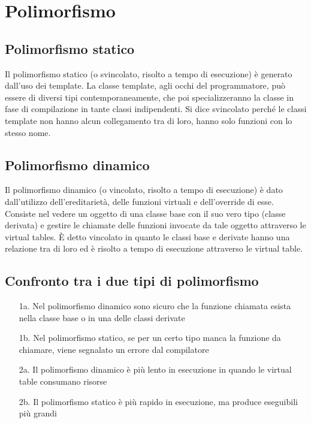 \documentclass[a4paper]{article}
\begin{document}
\newpage

\section{Polimorfismo}
\subsection{Polimorfismo statico}
Il polimorfismo statico (o svincolato, risolto a tempo di esecuzione) è generato dall'uso dei template. La classe template, agli
occhi del programmatore, può essere di diversi tipi contemporaneamente, che poi specializzeranno la classe in fase di compilazione
in tante classi indipendenti. Si dice svincolato perché le classi template non hanno alcun collegamento tra di loro, hanno solo
funzioni con lo stesso nome.

\subsection{Polimorfismo dinamico}
Il polimorfismo dinamico (o vincolato, risolto a tempo di esecuzione) è dato dall'utilizzo dell'ereditarietà, delle funzioni
virtuali e dell'override di esse. Consiste nel vedere un oggetto di una classe base con il suo vero tipo (classe derivata)
e gestire le chiamate delle funzioni invocate da tale oggetto attraverso le virtual tables. È detto vincolato in quanto le
classi base e derivate hanno una relazione  tra di loro ed è risolto a tempo di esecuzione attraverso le virtual table.

\subsection*{Confronto tra i due tipi di polimorfismo}
\begin{itemize}
	\item[1a.] Nel polimorfismo dinamico sono sicuro che la funzione chiamata esista nella classe base o in una delle classi derivate
	\item[1b.] Nel polimorfismo statico, se per un certo tipo manca la funzione da chiamare, viene segnalato un errore dal compilatore
	\item[2a.] Il polimorfismo dinamico è più lento in esecuzione in quando le virtual table consumano risorse
	\item[2b.] Il polimorfismo statico è più rapido in esecuzione, ma produce eseguibili più grandi  
\end{itemize}
\end{document}
